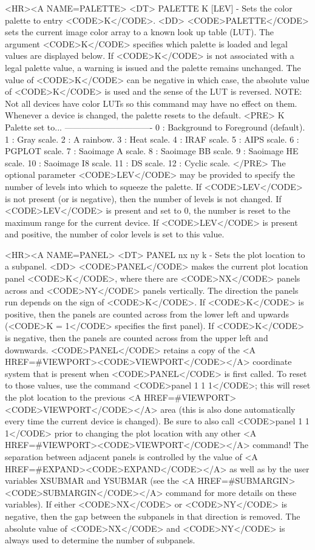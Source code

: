 \begin{rawhtml}
<HR><A NAME=PALETTE>
<DT>
PALETTE K [LEV] - Sets the color palette to entry <CODE>K</CODE>.
<DD>
	<CODE>PALETTE</CODE> sets the current image color array to a
	known look up table (LUT).  The argument <CODE>K</CODE> specifies
	which palette is loaded and legal values are displayed below.
	If <CODE>K</CODE> is not associated with a legal palette value,
	a warning is issued and the palette remains unchanged.  The
	value of <CODE>K</CODE> can be negative in which case, the
	absolute value of <CODE>K</CODE> is used and the sense of the LUT
	is reversed.
	NOTE: Not all devices have color LUTs so this
	command may have no effect on them.  Whenever a device is
	changed, the palette resets to the default.
	<PRE>
    K   Palette set to...
-------------------------------
    0 : Background to Foreground (default).
    1 : Gray scale.
    2 : A rainbow.
    3 : Heat scale.
    4 : IRAF scale.
    5 : AIPS scale.
    6 : PGPLOT scale.
    7 : Saoimage A scale.
    8 : Saoimage BB scale.
    9 : Saoimage HE scale.
   10 : Saoimage I8 scale.
   11 : DS scale.
   12 : Cyclic scale.
	</PRE>
	The optional parameter <CODE>LEV</CODE> may be provided to
	specify the number of levels into which to squeeze the palette.
	If <CODE>LEV</CODE> is not present (or is negative), then the
	number of levels is not changed.  If <CODE>LEV</CODE> is present
	and set to 0, the number is reset to the maximum range for the
	current device.  If <CODE>LEV</CODE> is present and positive,
	the number of color levels is set to this value.

<HR><A NAME=PANEL>
<DT>
PANEL nx ny k - Sets the plot location to a subpanel.
<DD>
	<CODE>PANEL</CODE> makes the current plot location panel
	<CODE>K</CODE>, where there are <CODE>NX</CODE> panels across
	and <CODE>NY</CODE> panels vertically.  The direction the panels
	run depends on the sign of <CODE>K</CODE>.  If <CODE>K</CODE> is
	positive, then the panels are counted across from the lower left
	and upwards (<CODE>K = 1</CODE> specifies the first panel).  If
	<CODE>K</CODE> is negative, then the panels are counted across
	from the upper left and downwards.  <CODE>PANEL</CODE> retains a
	copy of the <A HREF=#VIEWPORT><CODE>VIEWPORT</CODE></A> coordinate
	system that is present when <CODE>PANEL</CODE> is first called.
	To reset to those values, use the command <CODE>panel 1 1 1</CODE>;
	this will reset the plot location to the previous
	<A HREF=#VIEWPORT><CODE>VIEWPORT</CODE></A> area (this is also
	done automatically every time the current device is changed).
	Be sure to also call <CODE>panel 1 1 1</CODE> prior to changing
	the plot location with any other
	<A HREF=#VIEWPORT><CODE>VIEWPORT</CODE></A> command!  The
	separation between adjacent panels is controlled by the value of
	<A HREF=#EXPAND><CODE>EXPAND</CODE></A> as well as by the user
	variables XSUBMAR and YSUBMAR (see the
	<A HREF=#SUBMARGIN><CODE>SUBMARGIN</CODE></A> command for more
	details on these variables).  If either <CODE>NX</CODE> or
	<CODE>NY</CODE> is negative, then the gap between the subpanels in
	that direction is removed.  The absolute value of <CODE>NX</CODE>
	and <CODE>NY</CODE> is always used to determine the number of subpanels.


\end{rawhtml}
